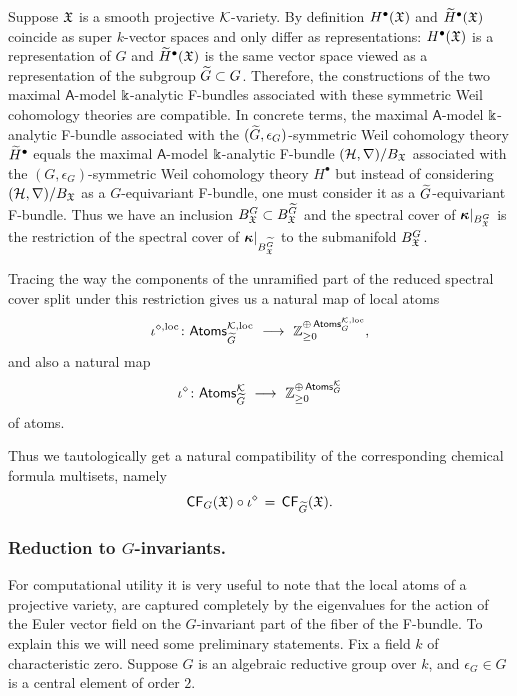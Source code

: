 \documentclass[twoside,leqno]{article}
\numberwithin{equation}{section}
\theoremstyle{plain}
\theoremstyle{definition}
\begin{document}
Suppose $\mathfrak X$ is  a smooth projective $\mathcal K$-variety. By definition 
$H^{\bullet}(\mathfrak X)$ and $\widetilde H^{\bullet}(\mathfrak X)$ coincide as super $k$-vector spaces and only differ as representations: $H^{\bullet}(\mathfrak X)$ is a representation of $G$ and $\widetilde H^{\bullet}(\mathfrak X)$  is the same vector space viewed as a representation of the subgroup $\widetilde G \subset G$. Therefore, the constructions of the two maximal 
$\mathsf{A}$-model $\Bbbk$-analytic F-bundles associated with these symmetric Weil cohomology theories are compatible. In concrete terms, the maximal 
$\mathsf{A}$-model $\Bbbk$-analytic F-bundle associated with the $(\widetilde G,\epsilon_{G})$-symmetric Weil cohomology theory $\widetilde H^{\bullet}$ equals the maximal 
$\mathsf{A}$-model $\Bbbk$-analytic F-bundle $(\mathcal H,\nabla)/B_{\mathfrak X}$ associated with the $(G,\epsilon_{G})$-symmetric Weil cohomology theory $H^{\bullet}$ but instead of considering 
$(\mathcal H,\nabla)/B_{\mathfrak X}$ as a $G$-equivariant F-bundle, one must consider it as a $\widetilde G$-equivariant F-bundle. Thus we have an inclusion $B_{\mathfrak X}^{G} \subset B_{\mathfrak X}^{\widetilde G}$ and the spectral cover of $\boldsymbol{\kappa}|_{B_{\mathfrak X}^{G}}$ is the restriction of the spectral cover of 
$\boldsymbol{\kappa}|_{B_{\mathfrak X}^{\widetilde G}}$ to the submanifold $B_{\mathfrak X}^{G}$.

Tracing the way the components of the unramified part of the reduced  spectral cover split under this restriction gives us a natural map of local atoms
\[
\iota^{\diamond,\op{loc}} \colon \mathsf{Atoms}_{\tG}^{\kay,\op{loc}} \ \longrightarrow \ \bbZ^{\oplus \, \mathsf{Atoms}_{G}^{\kay,\op{loc}}}_{\geq 0},
\]
and also a natural map  
\[
\iota^{\diamond} \colon \mathsf{Atoms}_{\tG}^{\kay} \ \longrightarrow \ 
\bbZ^{\oplus \, \mathsf{Atoms}_{G}^{\kay}}_{\geq 0}
\]
of atoms.


Thus we tautologically get a natural compatibility of the corresponding chemical formula multisets, namely
\[
\mathsf{CF}_{G}(\mathfrak X)\circ \iota^{\diamond} \, = \, \mathsf{CF}_{\widetilde G}(\mathfrak X).
\]

 
\medskip


\subsubsection{Reduction to $G$-invariants.} \label{ssec:Ginv}
For computational utility it is very useful to note that the local atoms of a projective variety, are captured completely by the eigenvalues for the action of the Euler vector field on the $G$-invariant part of the fiber of the F-bundle. To explain this we will need some preliminary statements. Fix a field $k$ of characteristic zero. Suppose $G$ is an algebraic reductive group over $k$, and $\epsilon_{G} \in G$ is a central element of order $2$.
\end{document}

